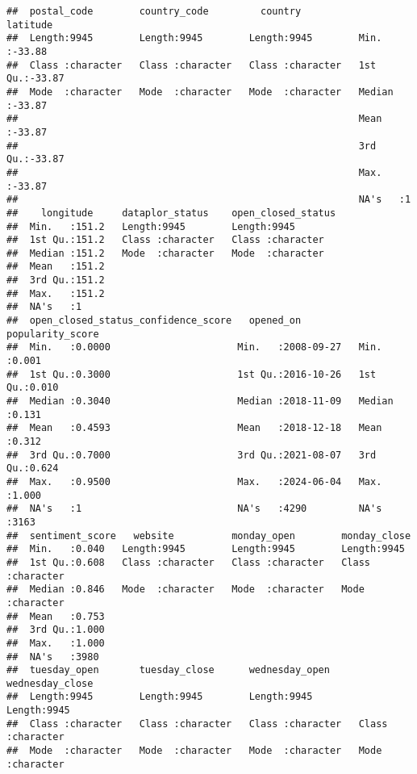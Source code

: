 \documentclass[
]{article}
\begin{document}
\begin{verbatim}
##  postal_code        country_code         country             latitude     
##  Length:9945        Length:9945        Length:9945        Min.   :-33.88  
##  Class :character   Class :character   Class :character   1st Qu.:-33.87  
##  Mode  :character   Mode  :character   Mode  :character   Median :-33.87  
##                                                           Mean   :-33.87  
##                                                           3rd Qu.:-33.87  
##                                                           Max.   :-33.87  
##                                                           NA's   :1       
##    longitude     dataplor_status    open_closed_status
##  Min.   :151.2   Length:9945        Length:9945       
##  1st Qu.:151.2   Class :character   Class :character  
##  Median :151.2   Mode  :character   Mode  :character  
##  Mean   :151.2                                        
##  3rd Qu.:151.2                                        
##  Max.   :151.2                                        
##  NA's   :1                                            
##  open_closed_status_confidence_score   opened_on          popularity_score
##  Min.   :0.0000                      Min.   :2008-09-27   Min.   :0.001   
##  1st Qu.:0.3000                      1st Qu.:2016-10-26   1st Qu.:0.010   
##  Median :0.3040                      Median :2018-11-09   Median :0.131   
##  Mean   :0.4593                      Mean   :2018-12-18   Mean   :0.312   
##  3rd Qu.:0.7000                      3rd Qu.:2021-08-07   3rd Qu.:0.624   
##  Max.   :0.9500                      Max.   :2024-06-04   Max.   :1.000   
##  NA's   :1                           NA's   :4290         NA's   :3163    
##  sentiment_score   website          monday_open        monday_close      
##  Min.   :0.040   Length:9945        Length:9945        Length:9945       
##  1st Qu.:0.608   Class :character   Class :character   Class :character  
##  Median :0.846   Mode  :character   Mode  :character   Mode  :character  
##  Mean   :0.753                                                           
##  3rd Qu.:1.000                                                           
##  Max.   :1.000                                                           
##  NA's   :3980                                                            
##  tuesday_open       tuesday_close      wednesday_open     wednesday_close   
##  Length:9945        Length:9945        Length:9945        Length:9945       
##  Class :character   Class :character   Class :character   Class :character  
##  Mode  :character   Mode  :character   Mode  :character   Mode  :character  

\end{verbatim}
\end{document}

